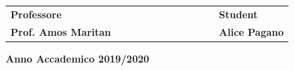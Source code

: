 \begin{titlepage}
\vspace{20mm}
\begin{spacing}{2}
\begin{tabular}{ l  c  c c c  cc c c c c  l }
{\Large{\bf Professore}} &&&&&&&&&&& {\Large{\bf Student }}\\
{\Large{\bf Prof. Amos Maritan}} &&&&&&&&&&& {\Large{\bf Alice Pagano}}\\
\end{tabular}
\end{spacing}
\vspace{15 mm}

\begin{center}
{\Large{\bf Anno Accademico 2019/2020}}
\end{center}
\end{titlepage}
\clearpage{\pagestyle{empty}\cleardoublepage}
